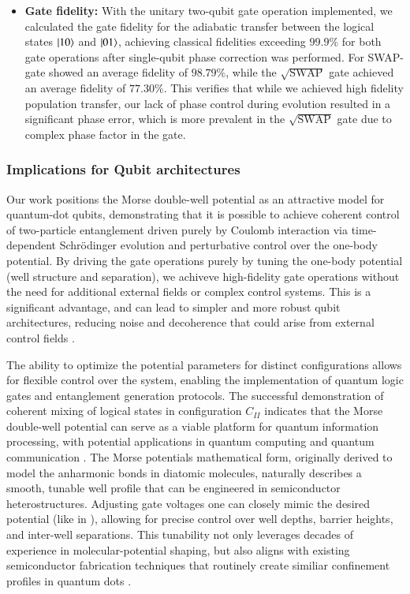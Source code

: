 \documentclass{subfiles}
\begin{document}
\begin{itemize}
    \item \textbf{Gate fidelity:} With the unitary two-qubit gate operation implemented, we calculated the gate fidelity for the adiabatic transfer between the logical states $\ket{10}$ and $\ket{01}$, achieving classical fidelities exceeding $99.9\%$ for both gate operations after single-qubit phase correction was performed. For SWAP-gate showed an average fidelity of $98.79\%$, while the $\sqrt{\text{SWAP}}$ gate achieved an average fidelity of $77.30\%$. This verifies that while we achieved high fidelity population transfer, our lack of phase control during evolution resulted in a significant phase error, which is more prevalent in the $\sqrt{\text{SWAP}}$ gate due to complex phase factor in the gate.
\end{itemize}

\subsubsection*{Implications for Qubit architectures}
Our work positions the Morse double-well potential as an attractive model for quantum-dot qubits, demonstrating that it is possible to achieve coherent control of two-particle entanglement driven purely by Coulomb interaction via time-dependent Schrödinger evolution and perturbative control over the one-body potential. By driving the gate operations purely by tuning the one-body potential (well structure and separation), we achiveve high-fidelity gate operations without the need for additional external fields or complex control systems. This is a significant advantage, and can lead to simpler and more robust qubit architectures, reducing noise and decoherence that could arise from external control fields \cite{petta2005coherent, kuhlmann2013charge, yoneda2018quantum}.

The ability to optimize the potential parameters for distinct configurations allows for flexible control over the system, enabling the implementation of quantum logic gates and entanglement generation protocols. The successful demonstration of coherent mixing of logical states in configuration $C_{II}$ indicates that the Morse double-well potential can serve as a viable platform for quantum information processing, with potential applications in quantum computing and quantum communication \cite{nielsen2010quantum}. The Morse potentials mathematical form, originally derived to model the anharmonic bonds in diatomic molecules\cite{morse1929diatomic}, naturally describes a smooth, tunable well profile that can be engineered in semiconductor heterostructures. Adjusting gate voltages one can closely mimic the desired potential (like in \cite{leinonen2024coulomb}), allowing for precise control over well depths, barrier heights, and inter-well separations. This tunability not only leverages decades of experience in molecular-potential shaping, but also aligns with existing semiconductor fabrication techniques that routinely create similiar confinement profiles in quantum dots \cite{jacak2013quantum, garcia2021semiconductor}.
\end{document}
